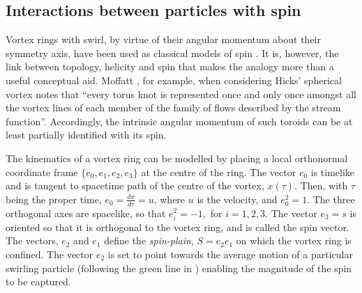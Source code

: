 
\subsection{Interactions between particles with spin}\label{sec:spin}
Vortex rings with swirl,
by virtue of their angular momentum about their symmetry axis, have been used as  classical models of spin \cite{Pekeris1953}.
It is, however, the link between topology, helicity and spin that makes the analogy more than a useful conceptual aid.
Moffatt \cite{Moffatt1969}, for example, when considering Hicks' spherical vortex notes  that 
``every torus knot is represented once and only once amongst all the vortex lines of each member of the family of flows described by the stream function''.
Accordingly, the intrinsic angular momentum of such toroids 
can be at least partially identified with its spin.


The kinematics of a vortex ring can be modelled by placing a local orthonormal coordinate frame $\{e_0, e_1, e_2, e_3\}$ at the centre of the ring.
The vector $e_0$ is timelike and is tangent to spacetime path of the centre of the vortex, $x(\tau)$.
Then, with $\tau$ being the proper time, $e_0 = \frac{dx}{d\tau} = u$, where $u$ is the velocity, and $e_0^2 = 1$.
The three orthogonal axes are spacelike, so that $e_i^2 = -1,$ for $i = 1,2,3$.
The vector $e_3 = s$ is oriented so that it is  orthogonal to the vortex ring, and is called the spin vector.
The vectors, $e_2$ and $e_1$ define the {\em spin-plain}, $S = e_2e_1$ on which the vortex ring is confined.
The vector $e_2$ is set to point towards the average motion of a particular swirling particle (following the green line in  )
enabling the magnitude of the spin to be captured.

